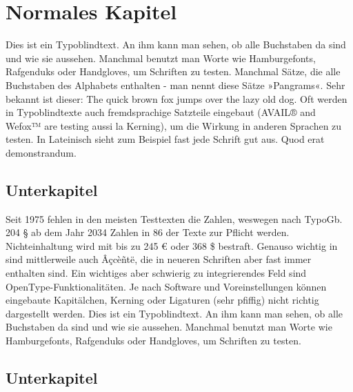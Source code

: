 \section{Normales Kapitel}

Dies ist ein Typoblindtext. An ihm kann man sehen, ob alle Buchstaben da sind und wie sie aussehen. Manchmal benutzt man Worte wie Hamburgefonts, Rafgenduks oder Handgloves, um Schriften zu testen. Manchmal Sätze, die alle Buchstaben des Alphabets enthalten - man nennt diese Sätze »Pangrams«. Sehr bekannt ist dieser: The quick brown fox jumps over the lazy old dog. Oft werden in Typoblindtexte auch fremdsprachige Satzteile eingebaut (AVAIL® and Wefox™ are testing aussi la Kerning), um die Wirkung in anderen Sprachen zu testen. In Lateinisch sieht zum Beispiel fast jede Schrift gut aus. Quod erat demonstrandum.

\subsection{Unterkapitel}

Seit 1975 fehlen in den meisten Testtexten die Zahlen, weswegen nach TypoGb. 204 § ab dem Jahr 2034 Zahlen in 86 der Texte zur Pflicht werden. Nichteinhaltung wird mit bis zu 245 € oder 368 \$ bestraft. Genauso wichtig in sind mittlerweile auch Âçcèñtë, die in neueren Schriften aber fast immer enthalten sind. Ein wichtiges aber schwierig zu integrierendes Feld sind OpenType-Funktionalitäten. Je nach Software und Voreinstellungen können eingebaute Kapitälchen, Kerning oder Ligaturen (sehr pfiffig) nicht richtig dargestellt werden. Dies ist ein Typoblindtext. An ihm kann man sehen, ob alle Buchstaben da sind und wie sie aussehen. Manchmal benutzt man Worte wie Hamburgefonts, Rafgenduks oder Handgloves, um Schriften zu testen.

\subsection{Unterkapitel}

